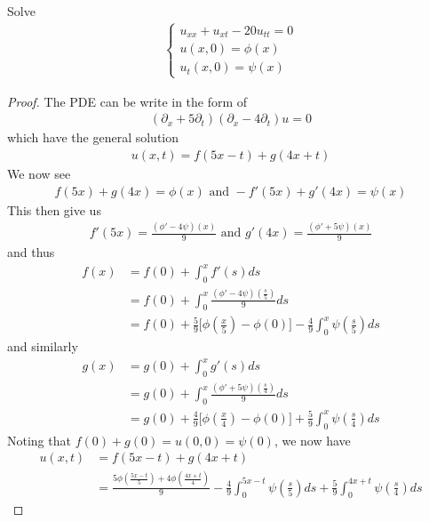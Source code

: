 \documentclass{report}
\begin{document}
\begin{question}{}{}
Solve 
\begin{align*}
\begin{cases}
u_{xx}+u_{xt}-20u_{tt}=0 \\
u(x,0)=\phi (x) \\
u_t(x,0)= \psi (x)
\end{cases}
\end{align*}
\end{question}
\begin{proof}
The PDE can be write in the form of 
\begin{align*}
  (\partial_x + 5\partial_t) (\partial_x - 4 \partial _t)u=0
\end{align*}
which have the general solution 
\begin{align*}
u(x,t)=f(5x-t)+g(4x+t)
\end{align*}
We now see 
\begin{align*}
f(5x)+g(4x)=\phi (x)\text{ and }-f'(5x)+g'(4x)=\psi (x)
\end{align*}
This then give us 
\begin{align*}
f'(5x)=\frac{(\phi' - 4\psi)(x)}{9}\text{ and }g'(4x)= \frac{(\phi '+5\psi )(x)}{9}
\end{align*}
and thus 
\begin{align*}
f(x)&=f(0)+ \int_0^x f'(s)ds\\
&=f(0)+\int_0^x \frac{(\phi' -4\psi)(\frac{s}{5})}{9}ds \\
&=f(0)+ \frac{5}{9}\Big[\phi (\frac{x}{5})-\phi (0) \Big] - \frac{4}{9}\int_0^x \psi (\frac{s}{5})ds
\end{align*}
and similarly 
\begin{align*}
g(x)&=g(0)+\int_0^x g'(s)ds \\
&=g(0)+ \int_0^x \frac{(\phi ' +5 \psi )(\frac{s}{4})}{9}ds \\
&=g(0)+ \frac{4}{9}\Big[ \phi (\frac{x}{4})- \phi (0) \Big]+\frac{5}{9} \int_0^x \psi (\frac{s}{4})ds
\end{align*}
Noting that $f(0)+g(0)=u(0,0)=\psi (0)$, we now have
\begin{align*}
u(x,t)&=f(5x-t)+g(4x+t) \\
&=\frac{5\phi (\frac{5x-t}{5})+4 \phi (\frac{4x+t}{4})}{9} - \frac{4}{9}\int_0^{5x-t}\psi (\frac{s}{5})ds + \frac{5}{9}\int_0^{4x+t}\psi (\frac{s}{4})ds
\end{align*}
\end{proof}
\end{document}
